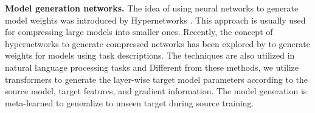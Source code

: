 \noindent
\textbf{Model generation networks.} 
The idea of using neural networks to generate model weights was introduced by Hypernetworks \cite{ha2016hypernetworks}. 
This approach is usually used for compressing large models into smaller ones. Recently, the concept of hypernetworks to generate compressed networks has been explored by \cite{zhmoginov2022hypertransformer} to generate weights for models using task descriptions. 
The techniques are also utilized in natural language processing tasks \cite{pilault2020conditionally, mahabadi2021parameter} and 
Different from these methods, we utilize transformers to generate the layer-wise target model parameters according to the source model, target features, and gradient information. The model generation is meta-learned to generalize to unseen target during source training.
























            








